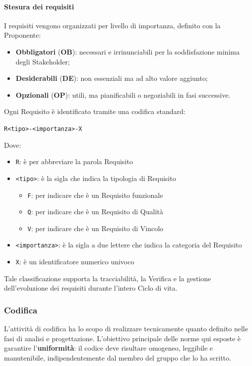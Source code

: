 \documentclass[a4paper,12pt]{article}
\begin{document}
\paragraph{Stesura dei requisiti}
I requisiti vengono organizzati per livello di importanza, definito con la Proponente:
\begin{itemize}
    \item \textbf{Obbligatori} (\textbf{OB}): necessari e irrinunciabili per la soddisfazione minima degli Stakeholder;
    \item \textbf{Desiderabili} (\textbf{DE}): non essenziali ma ad alto valore aggiunto;
    \item \textbf{Opzionali} (\textbf{OP}): utili, ma pianificabili o negoziabili in fasi successive.
\end{itemize}

Ogni Requisito è identificato tramite una codifica standard:
\begin{center}
    \texttt{R<tipo>-<importanza>-X}
\end{center}
Dove:
\begin{itemize}
    \item \texttt{R}: è per abbreviare la parola Requisito
    \item \texttt{<tipo>}: è la sigla che indica la tipologia di Requisito
    \begin{itemize}
        \item \texttt{F}: per indicare che è un Requisito funzionale
        \item \texttt{Q}: per indicare che è un Requisito di Qualità
        \item \texttt{V}: per indicare che è un Requisito di Vincolo
    \end{itemize}
    \item \texttt{<importanza>}: è la sigla a due lettere che indica la categoria del Requisito
    \item \texttt{X}: è un identificatore numerico univoco
\end{itemize}

Tale classificazione supporta la tracciabilità, la Verifica e la gestione dell’evoluzione dei requisiti durante l’intero Ciclo di vita.

\subsubsection{Codifica} \label{subsec:codifica}
L'attività di codifica ha lo scopo di realizzare tecnicamente quanto definito nelle fasi di analisi e progettazione.
L'obiettivo principale delle norme qui esposte è garantire l'\textbf{uniformità}: il codice deve risultare omogeneo, leggibile e manutenibile, indipendentemente dal membro del gruppo che lo ha scritto.
\end{document}

